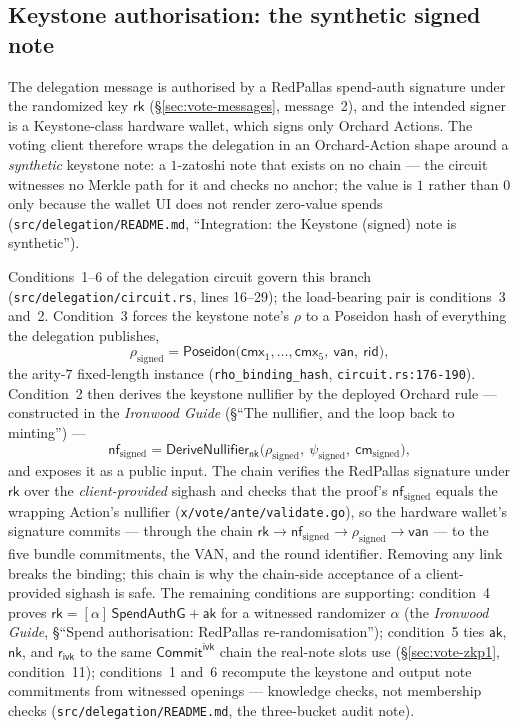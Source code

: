 \documentclass[11pt,a4paper]{article}
\theoremstyle{definition}
\newcommand{\nfsym}{\mathsf{nf}}
\newcommand{\cmsym}{\mathsf{cm}}
\newcommand{\cmx}{\mathsf{cmx}}
\newcommand{\rk}{\mathsf{rk}}
\newcommand{\CommitIvk}{\ensuremath{\mathsf{Commit}^{\mathsf{ivk}}}}
\newcommand{\aksym}{\ensuremath{\mathsf{ak}}}
\newcommand{\nksym}{\ensuremath{\mathsf{nk}}}
\newcommand{\rivk}{\ensuremath{\mathsf{r_{ivk}}}}
\begin{document}
\subsection{Keystone authorisation: the synthetic signed note}
\label{sec:vote-keystone}

The delegation message is authorised by a RedPallas spend-auth signature
under the randomized key $\rk$ (\S\ref{sec:vote-messages}, message~2), and
the intended signer is a Keystone-class hardware wallet, which signs only
Orchard Actions. The voting client therefore wraps the delegation in an
Orchard-Action shape around a \emph{synthetic} keystone note: a
$1$-zatoshi note that exists on no chain --- the circuit witnesses no
Merkle path for it and checks no anchor; the value is $1$ rather than $0$
only because the wallet UI does not render zero-value spends
(\texttt{src/delegation/README.md}, ``Integration: the Keystone (signed)
note is synthetic'').

Conditions~1--6 of the delegation circuit govern this branch
(\texttt{src/delegation/circuit.rs}, lines 16--29); the load-bearing pair
is conditions~3 and~2. Condition~3 forces the keystone note's $\rho$ to a
Poseidon hash of everything the delegation publishes,
\[
\rho_{\mathrm{signed}} = \mathsf{Poseidon}\bigl(\cmx_1, \ldots, \cmx_5,\
\mathsf{van},\ \mathsf{rid}\bigr),
\]
the arity-$7$ fixed-length instance (\texttt{rho\_binding\_hash},
\texttt{circuit.rs:176-190}). Condition~2 then derives the keystone
nullifier by the deployed Orchard rule --- constructed in the
\emph{Ironwood Guide} (\S``The nullifier, and the loop back to minting'') ---
\[
\nfsym_{\mathrm{signed}} =
\mathsf{DeriveNullifier}_{\nksym}\bigl(\rho_{\mathrm{signed}},\
\psi_{\mathrm{signed}},\ \cmsym_{\mathrm{signed}}\bigr),
\]
and exposes it as a public input. The chain verifies the RedPallas
signature under $\rk$ over the \emph{client-provided} sighash and checks
that the proof's $\nfsym_{\mathrm{signed}}$ equals the wrapping Action's
nullifier (\texttt{x/vote/ante/validate.go}), so the hardware wallet's
signature commits --- through the chain
$\rk \rightarrow \nfsym_{\mathrm{signed}} \rightarrow
\rho_{\mathrm{signed}} \rightarrow \mathsf{van}$ --- to the five bundle
commitments, the VAN, and the round identifier. Removing any link breaks
the binding; this chain is why the chain-side acceptance of a
client-provided sighash is safe. The remaining conditions are supporting:
condition~4 proves $\rk = [\alpha]\,\mathsf{SpendAuthG} + \aksym$ for a
witnessed randomizer $\alpha$ (the \emph{Ironwood Guide},
\S``Spend authorisation: RedPallas re-randomisation''); condition~5 ties $\aksym$,
$\nksym$, and $\rivk$ to the same \CommitIvk{} chain the real-note slots
use (\S\ref{sec:vote-zkp1}, condition~11); conditions~1 and~6 recompute
the keystone and output note commitments from witnessed openings ---
knowledge checks, not membership checks
(\texttt{src/delegation/README.md}, the three-bucket audit note).
\end{document}
